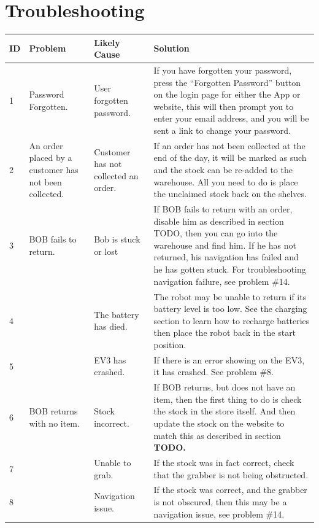\documentclass[onecolumn]{IEEEtran}
\begin{document}
{\let\clearpage\relax \section{Troubleshooting}}
\begin{table}[H]
  \centering
  \begin{tabular}{ | m{0.4cm} | m{3.5cm} | m{3.5cm} | m{10cm} | }
    \hline
    ID & Problem & Likely Cause & Solution
    \\ \hline
    1 & Password Forgotten. & User forgotten password. & If you have forgotten your password, press the “Forgotten Password” button on the login page for either the App or website, this will then prompt you to enter your email address, and you will be sent a link to change your password. 
    \\ \hline
    2 & An order placed by a customer has not been collected. & Customer has not collected an order. & If an order has not been collected at the end of the day, it will be marked as such and the stock can be re-added to the warehouse. All you need to do is place the unclaimed stock back on the shelves.
    \\ \hline
    3 & BOB fails to return. & Bob is stuck or lost & If BOB fails to return with an order, disable him as described in section TODO, then you can go into the warehouse and find him. If he has not returned, his navigation has failed and he has gotten stuck. For troubleshooting navigation failure, see problem \#14.
    \\ \hline
    4 &  & The battery has died. & The robot may be unable to return if its battery level is too low. See the charging section to learn how to recharge batteries then place the robot back in the start position.
    \\ \hline
    5 &  & EV3 has crashed. & If there is an error showing on the EV3, it has crashed. See problem \#8. 
    \\ \hline
    6 & BOB returns with no item. & Stock incorrect. & If BOB returns, but does not have an item, then the first thing to do is check the stock in the store itself. And then update the stock on the website to match this as described in section \textbf{TODO.}
    \\ \hline
    7 &  & Unable to grab. & If the stock was in fact correct, check that the grabber is not being obstructed.
    \\ \hline
    8 &  & Navigation issue. & If the stock was correct, and the grabber is not obscured, then this may be a navigation issue, see problem \#14.

\end{tabular}
\end{table}
\end{document}
